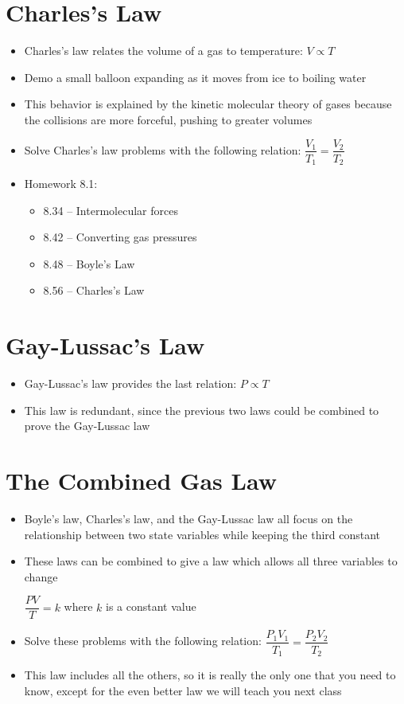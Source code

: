 \documentclass[12pt, openany, letterpaper]{memoir}
\begin{document}
\section{Charles's Law}
\begin{itemize}
	\item Charles's law relates the volume of a gas to temperature: $V\propto T$
	\item Demo a small balloon expanding as it moves from ice to boiling water
	\item This behavior is explained by the kinetic molecular theory of gases because the collisions are more forceful, pushing to greater volumes
	\item Solve Charles's law problems with the following relation: $\dfrac{V_1}{T_1}=\dfrac{V_2}{T_2}$
	\item Homework 8.1:
	\begin{itemize}
		\item 8.34 -- Intermolecular forces
		\item 8.42 -- Converting gas pressures
		\item 8.48 -- Boyle's Law
		\item 8.56 -- Charles's Law
	\end{itemize}
\end{itemize}
\section{Gay-Lussac's Law}
\begin{itemize}
	\item Gay-Lussac's law provides the last relation: $P\propto T$
	\item This law is redundant, since the previous two laws could be combined to prove the Gay-Lussac law
\end{itemize}
\section{The Combined Gas Law}
\begin{itemize}
	\item Boyle's law, Charles's law, and the Gay-Lussac law all focus on the relationship between two state variables while keeping the third constant
	\item These laws can be combined to give a law which allows all three variables to change
	
	$\dfrac{PV}{T} = k$ where $k$ is a constant value
	\item Solve these problems with the following relation: $\dfrac{P_1V_1}{T_1}=\dfrac{P_2V_2}{T_2}$
	\item This law includes all the others, so it is really the only one that you need to know, except for the even better law we will teach you next class
\end{itemize}
\end{document}
